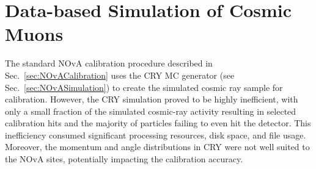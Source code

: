 

\section{Data-based Simulation of Cosmic Muons}\label{sec:DataBasedSimulation}
The standard \gls{NOvA} calibration procedure described in Sec.~\ref{sec:NOvACalibration} uses the \gls{CRY} \gls{MC} generator (see Sec.~\ref{sec:NOvASimulation}) to create the simulated cosmic ray sample for calibration. However, the \gls{CRY} simulation proved to be highly inefficient, with only a small fraction of the simulated cosmic-ray activity resulting in selected calibration hits and the majority of particles failing to even hit the detector. This inefficiency consumed significant processing resources, disk space, and file usage. Moreover, the momentum and angle distributions in \gls{CRY} were not well suited to the \gls{NOvA} sites, potentially impacting the calibration accuracy.

